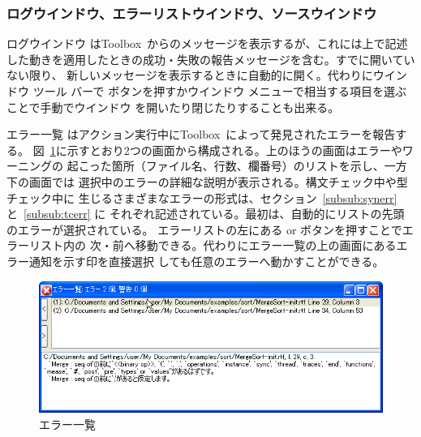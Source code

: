 \documentclass[\pformat,12pt]{jarticle}
\newcommand{\Toolbox}{Toolbox}
\newcommand{\guicmd}[1]{{\gt #1}}
\begin{document}
\subsubsection{ログウインドウ、エラーリストウインドウ、ソースウインドウ}


\guicmd{ログウインドウ} は\Toolbox\ からのメッセージを表示するが、これには上で記述
した動きを適用したときの成功・失敗の報告メッセージを含む。すでに開いていない限り、
新しいメッセージを表示するときに自動的に開く。代わりに\guicmd{ウインドウ} ツール
バーで 
ボタンを押すか\guicmd{ウインドウ} メニューで相当する項目を選ぶことで手動でウインドウ
を開いたり閉じたりすることも出来る。


\guicmd{エラー一覧} はアクション実行中に\Toolbox\ によって発見されたエラーを報告する。
図~\ref{fig:error2}に示すとおり2つの画面から構成される。上のほうの画面はエラーやワーニングの
起こった箇所（ファイル名、行数、欄番号）のリストを示し、一方下の画面では
選択中のエラーの詳細な説明が表示される。構文チェック中や型チェック中に
生じるさまざまなエラーの形式は、セクション~\ref{subsub:synerr} と~\ref{subsub:tcerr} に
それぞれ記述されている。最初は、自動的にリストの先頭のエラーが選択されている。
エラーリストの左にある {\fbox{\tt >}} or \fbox{{\tt <}} ボタンを押すことでエラーリスト内の
次・前へ移動できる。代わりに\guicmd{エラー一覧}の上の画面にあるエラー通知を示す印を直接選択
しても任意のエラーへ動かすことができる。

\begin{figure}[tbh]
\begin{center}
\includegraphics[width=\textwidth]{errorList-pp.png}
\caption{エラー一覧}
\label{fig:error2}
\end{center}
\end{figure}
\end{document}
